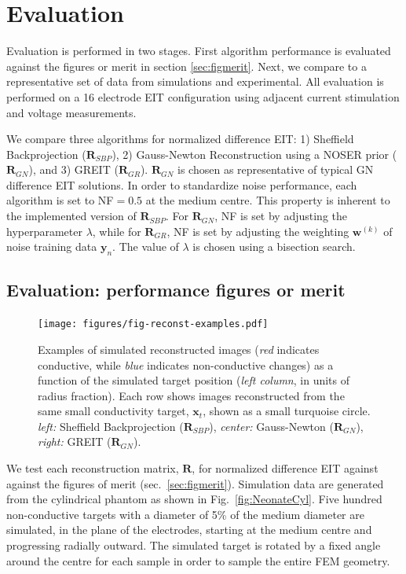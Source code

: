 \documentclass[12pt]{iopart}
\newcommand{\xB}{\mbox{$\mathbf{x}$}}
\newcommand{\yB}{\mbox{$\mathbf{y}$}}
\newcommand{\wB}{\mbox{$\mathbf{w}$}}
\newcommand{\RB}{\mbox{$\mathbf{R}$}}
\begin{document}
\section{Evaluation}

Evaluation is performed in two stages. First algorithm performance
is evaluated against the figures or merit in section
\ref{sec:figmerit}.
Next, we compare to a representative set of data
from simulations and experimental.
All evaluation is performed on a 16 electrode EIT configuration
using adjacent current stimulation and voltage measurements.

We compare three algorithms for normalized
difference EIT:
1) Sheffield Backprojection
    ($\RB_{SBP}$), 
2) Gauss-Newton Reconstruction using a
   NOSER prior
    ($\RB_{GN}$), 
and
3) GREIT ($\RB_{GR}$). 
$\RB_{GN}$ is chosen as representative
of typical GN difference EIT solutions.
 In order to standardize
noise performance, each algorithm is set to
NF$=0.5$ at the medium centre. This property
is inherent to the implemented version
of $\RB_{SBP}$. 
For $\RB_{GN}$, NF is set by 
adjusting the hyperparameter $\lambda$, while
for $\RB_{GR}$, NF is set by 
adjusting the weighting $\wB^{(k)}$ of noise
training data $\yB_n$. The value of $\lambda$ is chosen using
a bisection search.


\subsection{Evaluation: performance figures or merit}
\label{sec:perffigm}

\begin{figure}[bhtp]
\begin{center}
\texttt{[image: figures/fig-reconst-examples.pdf]}
\caption{
\label{fig:FoMimages}
Examples of simulated reconstructed images
({\em red} indicates conductive, while
 {\em blue} indicates non-conductive changes)
 as a function of the simulated target position
({\em left column}, in units of radius fraction). Each row
shows images reconstructed from the same small 
conductivity target, $\xB_t$, shown as 
a small turquoise circle.
{\em left:} Sheffield Backprojection ($\RB_{SBP}$),
{\em center:} Gauss-Newton ($\RB_{GN}$),
{\em right:} GREIT ($\RB_{GN}$).
}
\end{center}
\end{figure}

We test each reconstruction matrix, $\RB$,
for normalized difference EIT
against against the figures of merit 
(sec.\ \ref{sec:figmerit}). Simulation data
are generated from the cylindrical phantom
as shown in Fig.\ \ref{fig:NeonateCyl}. 
Five hundred 
non-conductive targets with a diameter of
5\% of the medium diameter are simulated,
 in the plane of the electrodes,
starting at the medium centre and 
progressing radially outward. The simulated 
target is rotated by a fixed angle around the centre
for each sample in order to sample the entire
FEM geometry.
\end{document}
